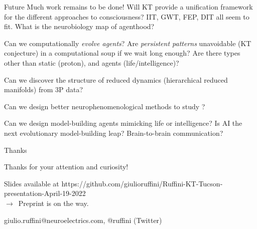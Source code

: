 \begin{frame}[label=ladila]{Future}
Much work remains to be done! Will KT provide a unification framework for the different approaches to consciousness? IIT, GWT, FEP, DIT all seem to fit. What is the neurobiology map of agenthood?\vfill

Can we computationally\textit{ evolve agents}? Are \textit{persistent patterns} unavoidable (KT conjecture) in a computational soup if we wait long enough? Are there  types other than static (proton), and agents  (life/intelligence)? \vfill


Can we discover the structure of reduced dynamics (hierarchical reduced manifolds) from 3P data? \vfill

Can we design better neurophenomenological methods to study \SEP?   \vfill

Can we design model-building agents mimicking life or intelligence? Is AI the next evolutionary model-building leap? Brain-to-brain communication?\vfill


\end{frame}


\begin{frame}[label=ladila]{Thanks}
\vfill
\begin{center}

   {\Large Thanks for your attention and curiosity!}  \vfill
   
    

    
    Slides available at {\small  https://github.com/giulioruffini/Ruffini-KT-Tucson-presentation-April-19-2022 }\\ $\rightarrow$~Preprint is on the way.\vspace{1.5cm} 
    
        giulio.ruffini@neuroelectrics.com, @ruffini (Twitter)  \vfill
        
\end{center}
\vfill

\end{frame}